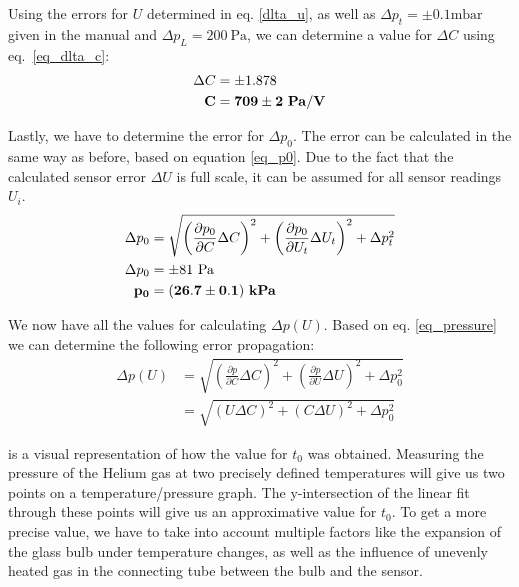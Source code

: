     Using the errors for $U$ determined in eq. \ref{dlta_u}, as well as $\Delta p_t = \pm 0.1 \si{\milli\bar}$ given in the manual and $\Delta p_L = 200~\si{\pascal}$,
    we can determine a value for $\Delta C$ using eq.~\ref{eq_dlta_c}:
    \begin{align}
        \Delta C &= \pm 1.878 \label{dlta_c}\\
        \bf C &= \bf 709 \pm 2 ~\si{\bf\pascal/\bf\volt}
    \end{align}

    Lastly, we have to determine the error for $\Delta p_0$. The error can be calculated in the same way as before, based on equation \ref{eq_p0}.
    Due to the fact that the calculated sensor error $\Delta U$ is full scale, it can be assumed for all sensor readings $U_i$.
    \begin{align}
        \Delta p_0 &= \sqrt{ \left(\frac{\partial p_0}{\partial C} \Delta C \right)^2 +
                            \left(\frac{\partial p_0}{\partial U_t} \Delta U_t \right)^2 +
                            \Delta p_t^2}\\
        \Delta p_0 &= \pm 81 ~\si{\pascal} \label{dlta_p0}\\
        \bf p_0 &= \bf (26.7 \pm 0.1) ~\si{\bf\kilo\pascal}
    \end{align}

    We now have all the values for calculating $\Delta p(U)$. Based on eq. \ref{eq_pressure} we can determine the following error propagation:
    \begin{align}
        \Delta p(U) &= \sqrt{ \left(\frac{\partial p}{\partial C} \Delta C \right)^2 +
                            \left(\frac{\partial p}{\partial U} \Delta U \right)^2 +
                            \Delta p_0^2}\\
        &= \sqrt{ \left( U \Delta C \right)^2 +
                \left( C \Delta U \right)^2 + 
                \Delta p_0^2} \label{eq_dlta_p}
    \end{align}

    is a visual representation of how the value for $t_0$ was obtained. Measuring the pressure of the Helium gas at two precisely
    defined temperatures will give us two points on a temperature/pressure graph. The y-intersection of the linear fit through these points will give us an approximative value for $t_0$.
    To get a more precise value, we have to take into account multiple factors like the expansion of the glass bulb under temperature changes, 
    as well as the influence of unevenly heated gas in the connecting tube between the bulb and the sensor.

